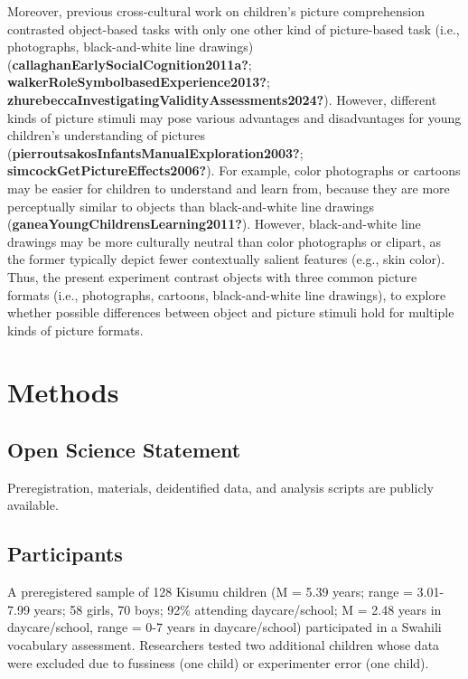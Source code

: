 \documentclass[10pt, letterpaper]{article}
\begin{document}
Moreover, previous cross-cultural work on children's picture
comprehension contrasted object-based tasks with only one other kind of
picture-based task (i.e., photographs, black-and-white line drawings)
(\textbf{callaghanEarlySocialCognition2011a?};
\textbf{walkerRoleSymbolbasedExperience2013?};
\textbf{zhurebeccaInvestigatingValidityAssessments2024?}). However,
different kinds of picture stimuli may pose various advantages and
disadvantages for young children's understanding of pictures
(\textbf{pierroutsakosInfantsManualExploration2003?};
\textbf{simcockGetPictureEffects2006?}). For example, color photographs
or cartoons may be easier for children to understand and learn from,
because they are more perceptually similar to objects than
black-and-white line drawings
(\textbf{ganeaYoungChildrensLearning2011?}). However, black-and-white
line drawings may be more culturally neutral than color photographs or
clipart, as the former typically depict fewer contextually salient
features (e.g., skin color). Thus, the present experiment contrast
objects with three common picture formats (i.e., photographs, cartoons,
black-and-white line drawings), to explore whether possible differences
between object and picture stimuli hold for multiple kinds of picture
formats.

\section{Methods}\label{methods}

\subsection{Open Science Statement}\label{open-science-statement}

Preregistration, materials, deidentified data, and analysis scripts are
publicly available.

\subsection{Participants}\label{participants}

A preregistered sample of 128 Kisumu children (M = 5.39 years; range =
3.01-7.99 years; 58 girls, 70 boys; 92\% attending daycare/school; M =
2.48 years in daycare/school, range = 0-7 years in daycare/school)
participated in a Swahili vocabulary assessment. Researchers tested two
additional children whose data were excluded due to fussiness (one
child) or experimenter error (one child).
\end{document}
